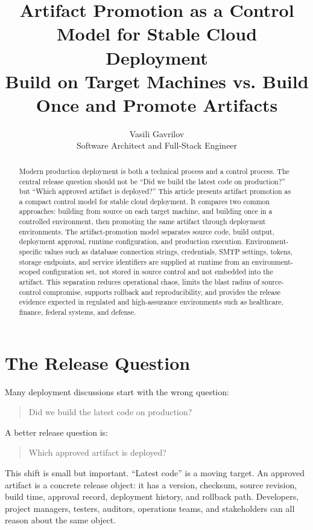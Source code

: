 \documentclass[11pt]{article}
\title{Artifact Promotion as a Control Model for Stable Cloud Deployment\\
\large Build on Target Machines vs. Build Once and Promote Artifacts}
\author{Vasili Gavrilov\\Software Architect and Full-Stack Engineer}
\date{}
\begin{document}
\maketitle

\begin{abstract}
Modern production deployment is both a technical process and a control process. The central release question should not be ``Did we build the latest code on production?'' but ``Which approved artifact is deployed?'' This article presents artifact promotion as a compact control model for stable cloud deployment. It compares two common approaches: building from source on each target machine, and building once in a controlled environment, then promoting the same artifact through deployment environments. The artifact-promotion model separates source code, build output, deployment approval, runtime configuration, and production execution. Environment-specific values such as database connection strings, credentials, SMTP settings, tokens, storage endpoints, and service identifiers are supplied at runtime from an environment-scoped configuration set, not stored in source control and not embedded into the artifact. This separation reduces operational chaos, limits the blast radius of source-control compromise, supports rollback and reproducibility, and provides the release evidence expected in regulated and high-assurance environments such as healthcare, finance, federal systems, and defense.
\end{abstract}

\section{The Release Question}

Many deployment discussions start with the wrong question:

\begin{quote}
Did we build the latest code on production?
\end{quote}

A better release question is:

\begin{quote}
Which approved artifact is deployed?
\end{quote}

This shift is small but important. ``Latest code'' is a moving target. An approved artifact is a concrete release object: it has a version, checksum, source revision, build time, approval record, deployment history, and rollback path. Developers, project managers, testers, auditors, operations teams, and stakeholders can all reason about the same object.
\end{document}

